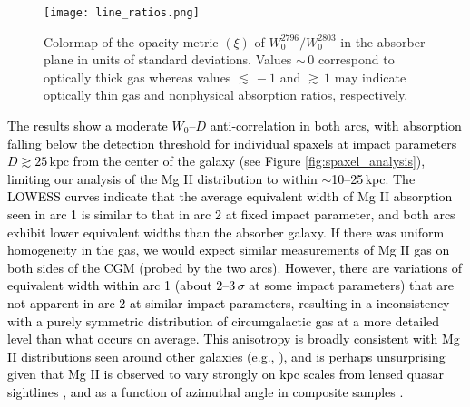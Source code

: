 \documentclass[twocolumn]{aastex62}
\newcommand{\MgII}{Mg\tiny{ }\footnotesize{II}\normalsize{ }}
\begin{document}
\begin{figure}[htb!]
    \centering
    \hspace{-2em}
    \texttt{[image: line\_ratios.png]}
    \caption{Colormap of the opacity metric $(\xi)$ of $W_0^{2796}/W_0^{2803}$ in the absorber plane in units of standard deviations. Values $\sim$\,0 correspond to optically thick gas whereas values $\lesssim \, -1$ and $\gtrsim \, 1$ may indicate optically thin gas and nonphysical absorption ratios, respectively.}
    \label{fig:opacity_ratios}
\end{figure}

\textcolor{black}{The results show a moderate $W_0$--$D$ anti-correlation in both arcs, with absorption falling below the detection threshold for individual spaxels at impact parameters $D\gtrsim25\,\text{kpc}$ from the center of the galaxy (see Figure \ref{fig:spaxel_analysis}), limiting our analysis of the \MgII distribution to within $\sim$10--25\,kpc. The LOWESS curves indicate that the average equivalent width of \MgII absorption seen in arc 1 is similar to that in arc 2 at fixed impact parameter, and both arcs exhibit lower equivalent widths than the absorber galaxy. If there was uniform homogeneity in the gas, we would expect similar measurements of \MgII gas on both sides of the CGM (probed by the two arcs). However, there are variations of equivalent width within arc 1 (about 2--3\,$\sigma$ at some impact parameters) that are not apparent in arc 2 at similar impact parameters, resulting in a inconsistency with a purely symmetric distribution of circumgalactic gas at a more detailed level than what occurs on average. This anisotropy is broadly consistent with \MgII distributions seen around other galaxies (e.g., \citealt{Lopez2018,Lopez2020}), and is perhaps unsurprising given that \MgII is observed to vary strongly on kpc scales from lensed quasar sightlines \citep[e.g.,][]{Ellison2004}, and as a function of azimuthal angle in composite samples \citep[e.g.,][]{Bordoloi2011}.}
\end{document}
